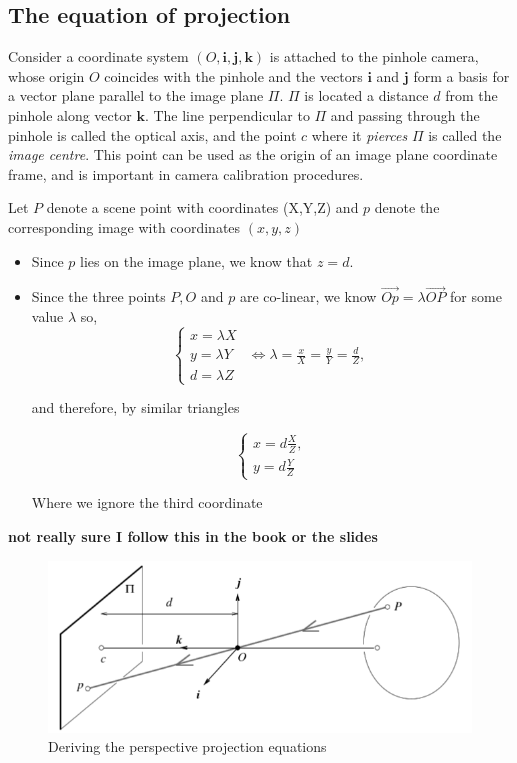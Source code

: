 \documentclass{article}
\begin{document}
\subsection{The equation of projection}

Consider a coordinate system $(O,\mathbf{i}, \mathbf{j} , \mathbf{k} )$ is attached to the pinhole camera, whose origin $O$ coincides with the pinhole and the vectors $\mathbf{i} $ and $\mathbf{j} $ form a basis for a vector plane parallel to the image plane $\Pi$. $\Pi$ is located a distance $d$ from the pinhole along vector $\mathbf{k}$. The line perpendicular to $\Pi $ and passing through the pinhole is called the optical axis, and the point $c$ where it \textit{pierces} $\Pi$ is called the \textit{image centre}. This point can be used as the origin of an image plane coordinate frame, and is important in camera calibration procedures.

Let $P$ denote a scene point with coordinates (X,Y,Z) and $p$ denote the corresponding image with coordinates $(x,y,z)$
\begin{itemize}
  \item Since $p$ lies on the image plane, we know that $z=d$.
  \item Since the three points $P,O$ and $p$ are co-linear, we know $\vec{Op} = \lambda \vec{OP}$ for some value $\lambda$ so,
        \[
        \begin{cases}
          x = \lambda X \\
          y = \lambda Y & \Longleftrightarrow \lambda = \frac{x}{X} = \frac{y}{Y} = \frac{d}{Z}, \\
          d = \lambda Z
        \end{cases}
        \]

        and therefore, by similar triangles

        \[
        \begin{cases}
          x = d \frac{X}{Z}, \\
          y = d \frac{Y}{Z}
        \end{cases}
        \]

        Where we ignore the third coordinate
\end{itemize}
\textbf{not really sure I follow this in the book or the slides }



\begin{figure}[ht]
  \centering
  \includegraphics[scale=0.6]{figures/perspectiveproof.png}
  \caption{\label{fig:perspective-proof} Deriving the perspective projection equations }
\end{figure}
\end{document}
